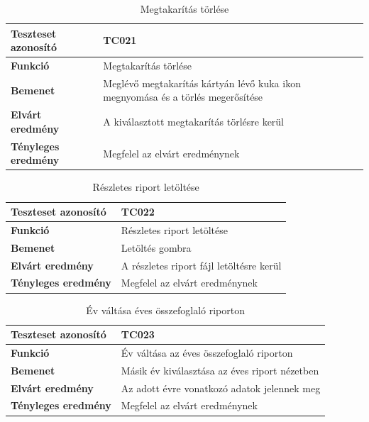 \begin{table}[h!]
	\centering
	\begin{tabular}{|l|p{10cm}|}
		\hline
		\textbf{Teszteset azonosító} & TC021 \\ \hline
		\textbf{Funkció} & Megtakarítás törlése \\ \hline
		\textbf{Bemenet} & Meglévő megtakarítás kártyán lévő kuka ikon megnyomása és a törlés megerősítése \\ \hline
		\textbf{Elvárt eredmény} & A kiválasztott megtakarítás törlésre kerül \\ \hline
		\textbf{Tényleges eredmény} & Megfelel az elvárt eredménynek \\ \hline
	\end{tabular}
	\caption{Megtakarítás törlése}
	\label{tab:megtakaritas_torles}
\end{table}

\begin{table}[h!]
	\centering
	\begin{tabular}{|l|p{10cm}|}
		\hline
		\textbf{Teszteset azonosító} & TC022 \\ \hline
		\textbf{Funkció} & Részletes riport letöltése \\ \hline
		\textbf{Bemenet} & Letöltés gombra \\ \hline
		\textbf{Elvárt eredmény} & A részletes riport fájl letöltésre kerül \\ \hline
		\textbf{Tényleges eredmény} & Megfelel az elvárt eredménynek \\ \hline
	\end{tabular}
	\caption{Részletes riport letöltése}
	\label{tab:reszletes_riport_letoltes}
\end{table}

\begin{table}[h!]
	\centering
	\begin{tabular}{|l|p{10cm}|}
		\hline
		\textbf{Teszteset azonosító} & TC023 \\ \hline
		\textbf{Funkció} & Év váltása az éves összefoglaló riporton \\ \hline
		\textbf{Bemenet} & Másik év kiválasztása az éves riport nézetben \\ \hline
		\textbf{Elvárt eredmény} & Az adott évre vonatkozó adatok jelennek meg \\ \hline
		\textbf{Tényleges eredmény} & Megfelel az elvárt eredménynek \\ \hline
	\end{tabular}
	\caption{Év váltása éves összefoglaló riporton}
	\label{tab:ev_valtasa_osszegzo_riport}
\end{table}

